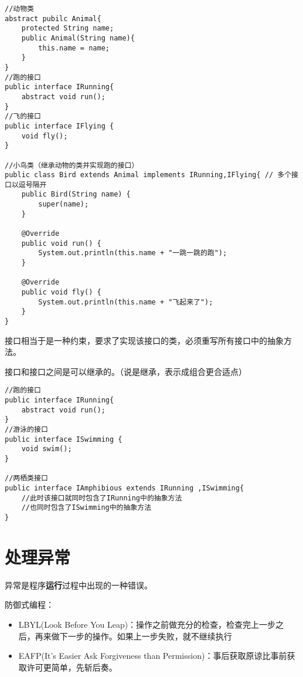 \documentclass[a4paper]{report}
\begin{document}
\begin{lstlisting}
//动物类
abstract pubilc Animal{
    protected String name;
    public Animal(String name){
        this.name = name;
    }
}
//跑的接口
public interface IRunning{
    abstract void run();
}
//飞的接口
public interface IFlying {
    void fly();
}

//小鸟类（继承动物的类并实现跑的接口）
public class Bird extends Animal implements IRunning,IFlying{ // 多个接口以逗号隔开
    public Bird(String name) {
        super(name);
    }

    @Override
    public void run() {
        System.out.println(this.name + "一跳一跳的跑");
    }

    @Override
    public void fly() {
        System.out.println(this.name + "飞起来了");
    }
}

\end{lstlisting}
\begin{tips}
接口相当于是一种约束，要求了实现该接口的类，必须重写所有接口中的抽象方法。
\end{tips}

接口和接口之间是可以继承的。（说是继承，表示成组合更合适点）
\begin{lstlisting}
//跑的接口
public interface IRunning{
    abstract void run();
}
//游泳的接口
public interface ISwimming {
    void swim();
}

//两栖类接口
public interface IAmphibious extends IRunning ,ISwimming{
    //此时该接口就同时包含了IRunning中的抽象方法
    //也同时包含了ISwimming中的抽象方法
}
\end{lstlisting}
\section{处理异常}
异常是程序\textbf{运行}过程中出现的一种错误。

防御式编程：
\begin{itemize}
\itemsep=0pt \parskip =0pt
\item LBYL(Look Before You Leap)：操作之前做充分的检查，检查完上一步之后，再来做下一步的操作。如果上一步失败，就不继续执行
\item EAFP(It's Easier Ask Forgiveness than Permission)：事后获取原谅比事前获取许可更简单，先斩后奏。
\end{itemize}
\end{document}

